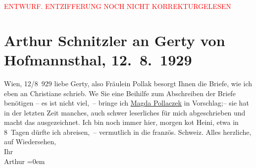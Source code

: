 
\begin{center}
            \textcolor{red}{ENTWURF. ENTZIFFERUNG NOCH NICHT KORREKTURGELESEN}
                      \end{center}
            
               \section[Arthur Schnitzler an Gerty von Hofmannsthal, 12. 8. 1929]{ Arthur Schnitzler an Gerty von Hofmannsthal, 12. 8. 1929}\nopagebreak{}\rehead{ }\begin{ledgroupsized}[t]{13cm}\normalsize\beginnumbering{} \toendnotes[C]{\smallbreak\pagebreak[2]} 
\pstart
           \raggedleft{}{\pb}Wien, 12/8 929\pend
           \pstart
           liebe Gerty, also Fräulein Pollak besorgt Ihnen die Briefe, wie ich eben an Christiane schrieb. We{\geminationn} Sie eine
               Beihilfe zum Abschreiben der Briefe benötigen – es ist nicht viel, – bringe ich \uline{Magda Pollaczek} in Vorschlag;– sie hat in der letzten Zeit manches, auch schwer leserliches für
               mich abgeschrieben und macht das ausgezeichnet.\pend
           \pstart
           Ich bin noch immer hier, morgen ko{\geminationm}t Heini, etwa in 8 Tagen dürfte ich abreisen, – vermutlich in die
                  französ. Schweiz. \pend
           \pstart
           Alles herzliche, auf Wiedersehen,{\\[\baselineskip]}Ihr{\\[\baselineskip]}\spacefill\mbox{Arthur}\pend
           \leftskip=0em{}\endnumbering{}\end{ledgroupsized}  \newcommand{\dateiname}{L02518}\newcommand{\titel}{Arthur Schnitzler an Gerty von Hofmannsthal, 12. 8. 1929}\newcommand{\editorInnen}{Martin Anton Müller und Gerd-Hermann Susen}
      